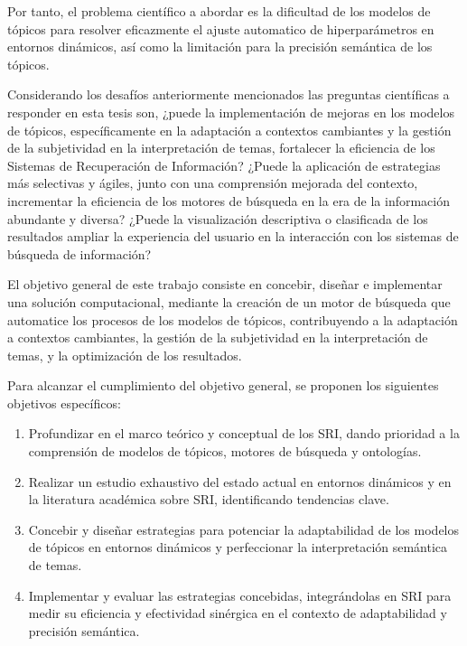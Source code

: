 Por tanto, el problema cient\'ifico a abordar es la dificultad de los modelos de t\'opicos para resolver eficazmente el ajuste automatico de hiperpar\'ametros en entornos din\'amicos, as\'i como la limitaci\'on para la precisi\'on sem\'antica de los t\'opicos.

Considerando los desafíos anteriormente mencionados las preguntas cient\'ificas a responder en esta tesis son, ¿puede la implementación de mejoras en los modelos de tópicos, específicamente en la adaptación a contextos cambiantes y la gestión de la subjetividad en la interpretación de temas, fortalecer la eficiencia de los Sistemas de Recuperación de Información? ¿Puede la aplicación de estrategias más selectivas y ágiles, junto con una comprensión mejorada del contexto, incrementar la eficiencia de los motores de búsqueda en la era de la información abundante y diversa? ¿Puede la visualización descriptiva o clasificada de los resultados ampliar la experiencia del usuario en la interacción con los sistemas de búsqueda de información?

El objetivo general de este trabajo consiste en concebir, diseñar e implementar una solución computacional, mediante la creaci\'on de un motor de b\'usqueda que automatice los procesos de los modelos de tópicos, contribuyendo a la adaptación a contextos cambiantes, la gestión de la subjetividad en la interpretación de temas, y la optimizaci\'on de los resultados. 

Para alcanzar el cumplimiento del objetivo general, se proponen los siguientes objetivos específicos:

\begin{enumerate}
\item Profundizar en el marco teórico y conceptual de los SRI, dando prioridad a la comprensión de modelos de tópicos, motores de búsqueda y ontologías.

\item Realizar un estudio exhaustivo del estado actual en entornos dinámicos y en la literatura académica sobre SRI, identificando tendencias clave.

\item Concebir y diseñar estrategias para potenciar la adaptabilidad de los modelos de tópicos en entornos dinámicos y perfeccionar la interpretación semántica de temas.

\item Implementar y evaluar las estrategias concebidas, integrándolas en SRI para medir su eficiencia y efectividad sinérgica en el contexto de adaptabilidad y precisión semántica.
\end{enumerate}

